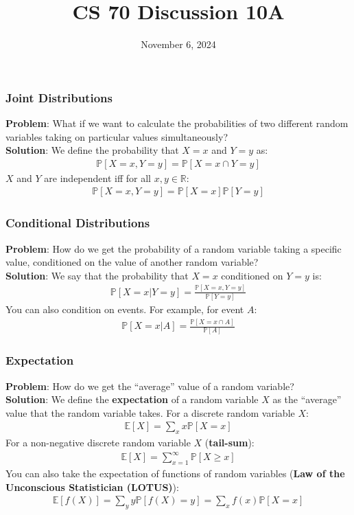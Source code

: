\documentclass{beamer}
\title{CS 70 Discussion 10A}
\date{November 6, 2024}
\begin{document}
\frame{\titlepage}

\begin{frame}
    \frametitle{Joint Distributions}
    {\bf Problem}: What if we want to calculate the probabilities of two different random variables taking on particular values simultaneously?\\
    {\bf Solution}: We define the probability that $X=x$ and $Y=y$ as:
    \begin{gather*}
        \mathbb{P}[X=x,Y=y]=\mathbb{P}[X=x\cap Y=y]
    \end{gather*}
    $X$ and $Y$ are independent iff for all $x,y\in\mathbb{R}$:
    \begin{gather*}
        \mathbb{P}[X=x,Y=y]=\mathbb{P}[X=x]\mathbb{P}[Y=y]
    \end{gather*}
\end{frame}

\begin{frame}
    \frametitle{Conditional Distributions}
    {\bf Problem}: How do we get the probability of a random variable taking a specific value, conditioned on the value of another random variable?\\
    {\bf Solution}: We say that the probability that $X=x$ conditioned on $Y=y$ is:
    \begin{gather*}
        \mathbb{P}[X=x|Y=y]=\frac{\mathbb{P}[X=x,Y=y]}{\mathbb{P}[Y=y]}
    \end{gather*}
    You can also condition on events. For example, for event $A$:
    \begin{gather*}
        \mathbb{P}[X=x|A]=\frac{\mathbb{P}[X=x\cap A]}{\mathbb{P}[A]}
    \end{gather*}
\end{frame}

\begin{frame}
    \frametitle{Expectation}
    {\bf Problem}: How do we get the ``average'' value of a random variable?\\
    {\bf Solution}: We define the {\bf expectation} of a random variable $X$ as the ``average'' value that the random variable takes. For a discrete random variable $X$:
    \begin{gather*}
        \mathbb{E}[X]=\sum_x x\mathbb{P}[X=x]
    \end{gather*}
    For a non-negative discrete random variable $X$ ({\bf tail-sum}):
    \begin{gather*}
        \mathbb{E}[X]=\sum_{x=1}^\infty\mathbb{P}[X\geq x]
    \end{gather*}
    You can also take the expectation of functions of random variables ({\bf Law of the Unconscious Statistician (LOTUS)}):
    \begin{gather*}
        \mathbb{E}[f(X)]=\sum_yy\mathbb{P}[f(X)=y]=\sum_xf(x)\mathbb{P}[X=x]
    \end{gather*}
\end{frame}
\end{document}
